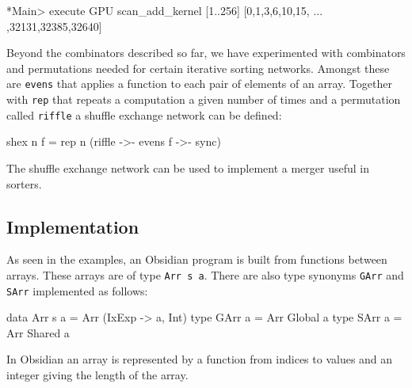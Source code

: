



\begin{code}
*Main> execute GPU scan_add_kernel [1..256]
[0,1,3,6,10,15, ... ,32131,32385,32640] 
\end{code}


Beyond the combinators described so far, we have experimented with combinators 
and permutations  needed for certain iterative sorting networks. Amongst these 
are {\tt evens} that applies a function to each pair of elements of an array. 
Together with {\tt rep} that repeats a computation a given number of times and 
a permutation called {\tt riffle} a shuffle exchange network can be defined: 


\begin{code}
shex n f = rep n (riffle ->- evens f ->- sync)
\end{code}

The shuffle exchange network can be used to implement a merger useful in sorters. 


\subsection{Implementation} 

As seen in the examples, an Obsidian program is built from functions between 
arrays. These arrays are of type {\tt Arr s a}. There are also type synonyms
{\tt GArr} and {\tt SArr} implemented as follows: 

\begin{code}
data Arr s a = Arr (IxExp ->  a, Int)
type GArr a = Arr Global a
type SArr a = Arr Shared a 
\end{code}
In Obsidian an array is represented by a function from indices to values and an 
integer giving the length of the array.

